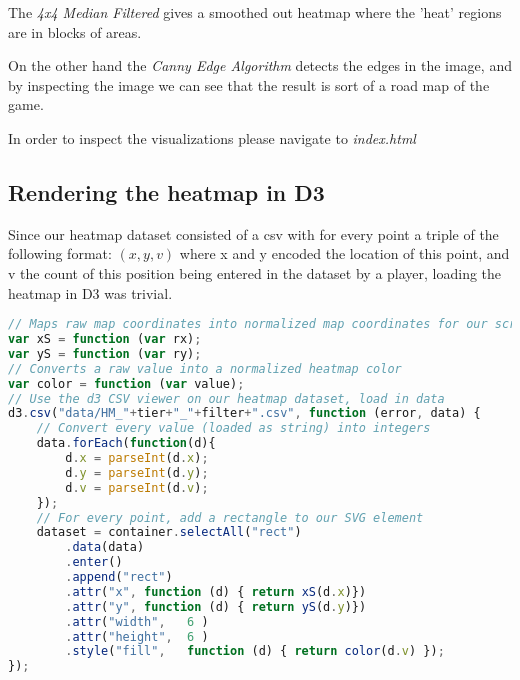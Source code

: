 The \textit{4x4 Median Filtered} gives a smoothed out heatmap where the 'heat' regions are in blocks of areas.

On the other hand the \textit{Canny Edge Algorithm} detects the edges in the image, and by inspecting the image we can see that the result is sort of a road map of the game.

In order to inspect the visualizations please navigate to \textit{index.html}

\subsection{Rendering the heatmap in D3}
Since our heatmap dataset consisted of a csv with for every point a triple of the following format: $(x, y, v)$ where x and y encoded the location of this point, and v the count of this position being entered in the dataset by a player, loading the heatmap in D3 was trivial.

\begin{lstlisting}[language=JavaScript]
// Maps raw map coordinates into normalized map coordinates for our screen
var xS = function (var rx);
var yS = function (var ry);
// Converts a raw value into a normalized heatmap color
var color = function (var value);
// Use the d3 CSV viewer on our heatmap dataset, load in data
d3.csv("data/HM_"+tier+"_"+filter+".csv", function (error, data) {
	// Convert every value (loaded as string) into integers
	data.forEach(function(d){
	    d.x = parseInt(d.x);
	    d.y = parseInt(d.y);
	    d.v = parseInt(d.v);
	});
	// For every point, add a rectangle to our SVG element
	dataset = container.selectAll("rect")
	    .data(data)
	    .enter()
	    .append("rect")
	    .attr("x", function (d) { return xS(d.x)})
	    .attr("y", function (d) { return yS(d.y)})
	    .attr("width",   6 ) 
	    .attr("height",  6 )
	    .style("fill",   function (d) { return color(d.v) });
});
\end{lstlisting}